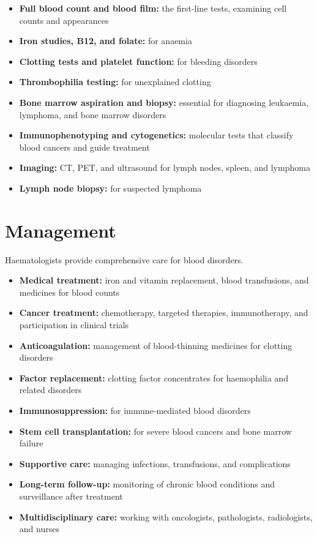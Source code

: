 \begin{itemize}
    \item \textbf{Full blood count and blood film:} the first-line tests, examining cell counts and appearances
    \item \textbf{Iron studies, B12, and folate:} for anaemia
    \item \textbf{Clotting tests and platelet function:} for bleeding disorders
    \item \textbf{Thrombophilia testing:} for unexplained clotting
    \item \textbf{Bone marrow aspiration and biopsy:} essential for diagnosing leukaemia, lymphoma, and bone marrow disorders
    \item \textbf{Immunophenotyping and cytogenetics:} molecular tests that classify blood cancers and guide treatment
    \item \textbf{Imaging:} CT, PET, and ultrasound for lymph nodes, spleen, and lymphoma
    \item \textbf{Lymph node biopsy:} for suspected lymphoma
\end{itemize}

\section*{Management}
Haematologists provide comprehensive care for blood disorders.

\begin{itemize}
    \item \textbf{Medical treatment:} iron and vitamin replacement, blood transfusions, and medicines for blood counts
    \item \textbf{Cancer treatment:} chemotherapy, targeted therapies, immunotherapy, and participation in clinical trials
    \item \textbf{Anticoagulation:} management of blood-thinning medicines for clotting disorders
    \item \textbf{Factor replacement:} clotting factor concentrates for haemophilia and related disorders
    \item \textbf{Immunosuppression:} for immune-mediated blood disorders
    \item \textbf{Stem cell transplantation:} for severe blood cancers and bone marrow failure
    \item \textbf{Supportive care:} managing infections, transfusions, and complications
    \item \textbf{Long-term follow-up:} monitoring of chronic blood conditions and surveillance after treatment
    \item \textbf{Multidisciplinary care:} working with oncologists, pathologists, radiologists, and nurses
\end{itemize}

